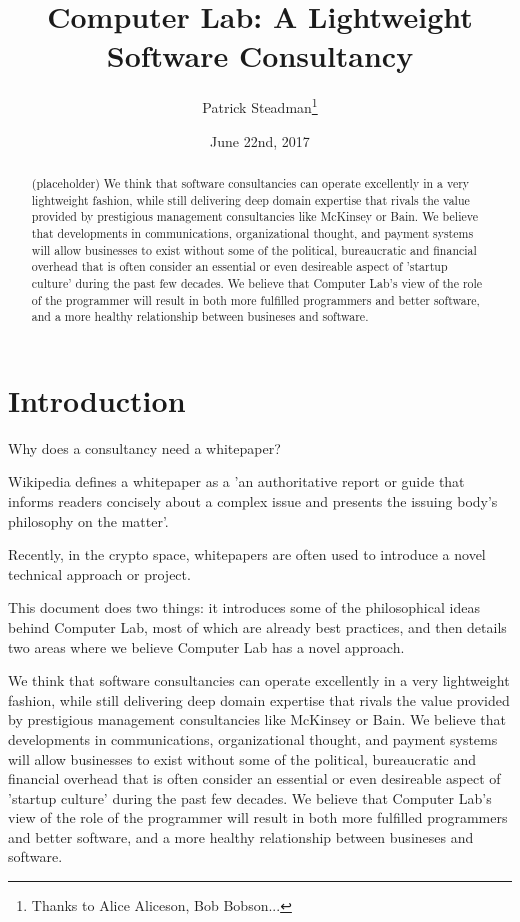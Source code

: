 \documentclass[12pt]{article}
\title{Computer Lab: A Lightweight Software Consultancy}
\author{Patrick Steadman\thanks{Thanks to Alice Aliceson, Bob Bobson...}}
\date{June 22nd, 2017}
\begin{document}
\maketitle

\begin{abstract}
(placeholder)
We think that software consultancies can operate excellently in a very
lightweight fashion, while still delivering deep domain expertise that rivals
the value provided by prestigious management consultancies like McKinsey or
Bain. We believe that developments in communications, organizational thought,
and payment systems will allow businesses to exist without some of the
political, bureaucratic and financial overhead that is often consider an
essential or even desireable aspect of 'startup culture' during the past few
decades. We believe that Computer Lab's view of the role of the programmer will
result in both more fulfilled programmers and better software, and a more
healthy relationship between busineses and software.
\end{abstract}

\section{Introduction}

Why does a consultancy need a whitepaper?

Wikipedia defines a whitepaper as a 'an authoritative report or guide that
informs readers concisely about a complex issue and presents the issuing body's
philosophy on the matter'.

Recently, in the crypto space, whitepapers are often used to introduce a novel
technical approach or project.

This document does two things: it introduces some of the philosophical ideas
behind Computer Lab, most of which are already best practices, and then details
two areas where we believe Computer Lab has a novel approach.

We think that software consultancies can operate excellently in a very
lightweight fashion, while still delivering deep domain expertise that rivals
the value provided by prestigious management consultancies like McKinsey or
Bain. We believe that developments in communications, organizational thought,
and payment systems will allow businesses to exist without some of the
political, bureaucratic and financial overhead that is often consider an
essential or even desireable aspect of 'startup culture' during the past few
decades. We believe that Computer Lab's view of the role of the programmer will
result in both more fulfilled programmers and better software, and a more
healthy relationship between busineses and software.
\end{document}
